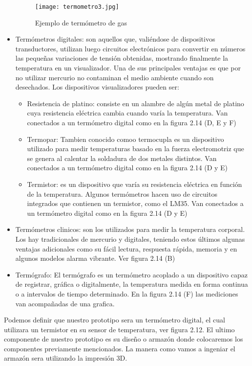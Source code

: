 \begin{itemize}
\begin{figure}[H]
\centering
\texttt{[image: termometro3.jpg]}
\caption{Ejemplo de termómetro de gas}
\end{figure}

\item Termómetros digitales: son aquellos que, valiéndose de dispositivos transductores, utilizan luego circuitos electrónicos para convertir en números las pequeñas variaciones de tensión obtenidas, mostrando finalmente la temperatura en un visualizador. Una de sus principales ventajas es que por no utilizar mercurio no contaminan el medio ambiente cuando son desechados. Los dispositivos visualizadores pueden ser:

\begin{itemize}

\item Resistencia de platino: consiste en un alambre de algún metal de platino cuya resistencia eléctrica cambia cuando varía la temperatura. Van conectados a un termómetro digital como en la figura 2.14 (D, E y F)

\item Termopar: Tambien conocido comoo termocupla es un dispositivo utilizado para medir temperaturas basado en la fuerza electromotriz que se genera al calentar la soldadura de dos metales distintos. Van conectados a un termómetro digital como en la figura 2.14 (D y E)

\item Termistor:  es un dispositivo que varía su resistencia eléctrica en función de la temperatura. Algunos termómetros hacen uso de circuitos integrados que contienen un termistor, como el LM35. Van conectados a un termómetro digital como en la figura 2.14 (D y E)

\end{itemize}

\item Termómetros clinicos: son los utilizados para medir la temperatura corporal. Los hay tradicionales de mercurio y digitales, teniendo estos últimos algunas ventajas adicionales como su fácil lectura, respuesta rápida, memoria y en algunos modelos alarma vibrante. Ver figura 2.14 (B)

\item Termógrafo: El termógrafo es un termómetro acoplado a un dispositivo capaz de registrar, gráfica o digitalmente, la temperatura medida en forma continua o a intervalos de tiempo determinado. En la figura 2.14 (F) las mediciones van acompañadas de una grafica.
	
\end{itemize}

\par \noindent
Podemos definir que nuestro prototipo sera un termómetro digital, el cual utilizara un termistor en su sensor de temperatura, ver figura 2.12. El ultimo componente de nuestro prototipo es su diseño o armazón donde colocaremos los componentes previamente mencionados. La manera como vamos a ingeniar el armazón sera utilizando la impresión 3D.

